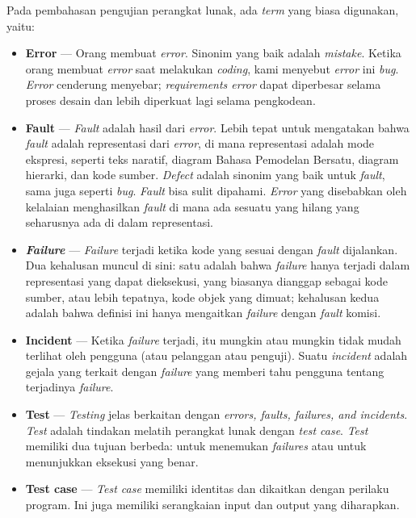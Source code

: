 \documentclass[a4paper,twoside]{article}
\begin{document}
\begin{enumerate}
Pada pembahasan pengujian perangkat lunak, ada \textit{term} yang biasa digunakan, yaitu:
\begin{itemize}
\item \textbf{Error} --- Orang membuat \textit{error}. Sinonim yang baik adalah \textit{mistake}. Ketika orang membuat \textit{error} saat melakukan \textit{coding}, kami menyebut \textit{error} ini \textit{bug}. \textit{Error} cenderung menyebar; \textit{requirements error} dapat diperbesar selama proses desain dan lebih diperkuat lagi selama pengkodean.
\item \textbf{Fault} --- \textit{Fault} adalah hasil dari \textit{error}. Lebih tepat untuk mengatakan bahwa \textit{fault} adalah representasi dari \textit{error}, di mana representasi adalah mode ekspresi, seperti teks naratif, diagram Bahasa Pemodelan Bersatu, diagram hierarki, dan kode sumber. \textit{Defect} adalah sinonim yang baik untuk \textit{fault}, sama juga seperti \textit{bug}. \textit{Fault} bisa sulit dipahami. \textit{Error} yang disebabkan oleh kelalaian menghasilkan \textit{fault} di mana ada sesuatu yang hilang yang seharusnya ada di dalam representasi.
\item \textit{\textbf{Failure}} --- \textit{Failure} terjadi ketika kode yang sesuai dengan \textit{fault} dijalankan. Dua kehalusan muncul di sini: satu adalah bahwa \textit{failure} hanya terjadi dalam representasi yang dapat dieksekusi, yang biasanya dianggap sebagai kode sumber, atau lebih tepatnya, kode objek yang dimuat; kehalusan kedua adalah bahwa definisi ini hanya mengaitkan \textit{failure} dengan \textit{fault} komisi.
\item \textbf{Incident} --- Ketika \textit{failure} terjadi, itu mungkin atau mungkin tidak mudah terlihat oleh pengguna (atau pelanggan atau penguji). Suatu \textit{incident} adalah gejala yang terkait dengan \textit{failure} yang memberi tahu pengguna tentang terjadinya \textit{failure}.
\item \textbf{Test} --- \textit{Testing} jelas berkaitan dengan  \textit{errors, faults, failures, and incidents}. \textit{Test} adalah tindakan melatih perangkat lunak dengan \textit{test case}. \textit{Test} memiliki dua tujuan berbeda: untuk menemukan \textit{failures} atau untuk menunjukkan eksekusi yang benar.
\item \textbf{Test case} --- \textit{Test case} memiliki identitas dan dikaitkan dengan perilaku program. Ini juga memiliki serangkaian input dan output yang diharapkan.
\end{itemize}
\begin{figure}[h!]

\end{figure}
\end{enumerate}
\end{document}
